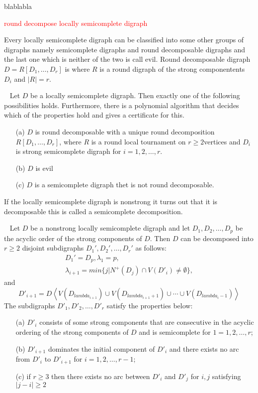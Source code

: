 blablabla
\begin{thm}
    \textcolor{red}{round decompose locally semicomplete digraph}
\end{thm}
Every locally semicomplete digraph can be classified into some other groups of digraphs namely semicomplete digraphs and round decomposable digraphs and the last one which is neither of the two is call evil. Round decomposable digraph $D=R[D_1,\dots,D_r]$ is where $R$ is a round digraph of the strong componentents $D_i$ and $|R|=r$.
\begin{thm}~\cite{bangJGT85}
    Let $D$ be a locally semicomplete digraph. Then exactly one of the following possibilities holds. Furthermore, there is a polynomial algorithm that decides which of the properties hold and gives a certificate for this.
    \begin{itemize}
        \item[(a)] $D$ is round decomposable with a unique round decomposition $R[D_1,\dots ,D_r]$, where $R$ is a round local tournament on $r\geq 2$vertices and $D_i$ is strong semicomplete digraph for $i=1,2,\dots,r$.
        \item[(b)] $D$ is evil 
        \item[(c)] $D$ is a semicomplete digraph thet is not round decomposable. 
    \end{itemize}
\end{thm}
If the locally semicomplete digraph is nonstrong it turns out that it is decomposable this is called a semicomplete decomposition.
\begin{thm}~\cite{bangJGT85,banggutin,bangJCT102}
    Let $D$ be a nonstrong locally semicomplete digraph and let $D_1,D_2,\dots,D_p$ be the acyclic order of the strong components of $D$. Then $D$ can be decomposed into $r\geq 2$ disjoint subdigraphs $D_1',D_2',\dots, D_r'$ as follows:
    \begin{align*}
        D_1'=D_p, \lambda_1=p,\\
        \lambda_{i+1}=min\lbrace j|N^+(D_j)\cap V(D'_i)\neq \emptyset\rbrace,
    \end{align*}
    and
    \begin{equation*}
        D'_{i+1}=D\left<V(D_{lambda_{i+1}})\cup V(D_{lambda_{i+1}+1})\cup \cdots \cup V(D_{lambda_{i}-1})\right>
    \end{equation*}
    The subdigraphs $D'_1,D'_2,\dots,D'_r$ satisfy the properties below:
    \begin{itemize}
        \item[(a)] $D'_i$ consists of some strong components that are consecutive in the acyclic ordering of the strong components of $D$ and is semicomplete for $1=1,2,\dots,r$;
        \item[(b)] $D'_{i+1}$ dominates the initial component of $D'_i$ and there exists no arc from $D'_i$ to $D'_{i+1}$ for $i=1,2,\dots,r-1$;
        \item[(c)] if $r\geq 3$ then there exists no arc between $D'_i$ and $D'_j$ for $i,j$ satisfying $|j-i|\geq 2$  
    \end{itemize}
    \label{thm:semicompletedecom}
\end{thm}
